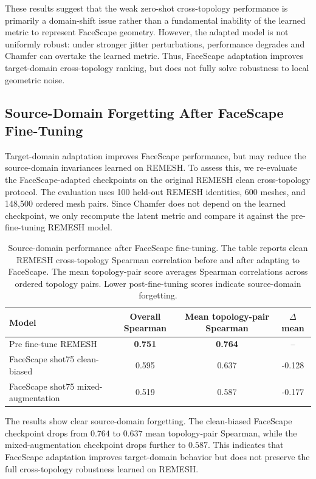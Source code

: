\documentclass{article}
\begin{document}
These results suggest that the weak zero-shot cross-topology performance is
primarily a domain-shift issue rather than a fundamental inability of the learned
metric to represent FaceScape geometry. However, the adapted model is not
uniformly robust: under stronger jitter perturbations, performance degrades and
Chamfer can overtake the learned metric. Thus, FaceScape adaptation improves
target-domain cross-topology ranking, but does not fully solve robustness to
local geometric noise.

\subsection{Source-Domain Forgetting After FaceScape Fine-Tuning}
\label{app:faceverse_forgetting}

Target-domain adaptation improves FaceScape performance, but may reduce the
source-domain invariances learned on REMESH. To assess this, we re-evaluate the
FaceScape-adapted checkpoints on the original REMESH clean cross-topology
protocol. The evaluation uses 100 held-out REMESH identities, 600 meshes, and
148,500 ordered mesh pairs. Since Chamfer does not depend on the learned
checkpoint, we only recompute the latent metric and compare it against the
pre-fine-tuning REMESH model.

\begin{table}[h]
\centering
\small
\caption{
Source-domain performance after FaceScape fine-tuning. The table reports clean
REMESH cross-topology Spearman correlation before and after adapting to
FaceScape. The mean topology-pair score averages Spearman correlations across
ordered topology pairs. Lower post-fine-tuning scores indicate source-domain
forgetting.
}
\label{tab:faceverse_finetune_forgetting_app}
\begin{tabular}{lccc}
\toprule
Model & Overall Spearman & Mean topology-pair Spearman & $\Delta$ mean \\
\midrule
Pre fine-tune REMESH & \textbf{0.751} & \textbf{0.764} & -- \\
FaceScape shot75 clean-biased & 0.595 & 0.637 & -0.128 \\
FaceScape shot75 mixed-augmentation & 0.519 & 0.587 & -0.177 \\
\bottomrule
\end{tabular}
\end{table}

The results show clear source-domain forgetting. The clean-biased FaceScape
checkpoint drops from $0.764$ to $0.637$ mean topology-pair Spearman, while the
mixed-augmentation checkpoint drops further to $0.587$. This indicates that
FaceScape adaptation improves target-domain behavior but does not preserve the
full cross-topology robustness learned on REMESH.
\end{document}
